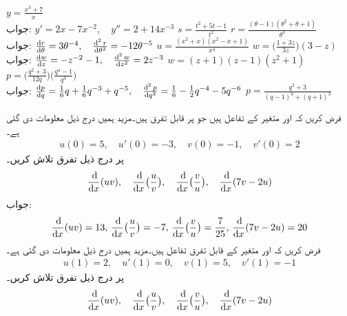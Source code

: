 $y=\tfrac{x^3+7}{x}$\\
جواب:\quad
$y'=2x-7x^{-2},\quad y''=2+14x^{-3}$
$s=\tfrac{t^2+5t-1}{t^2}$
$r=\tfrac{(\theta-1)(\theta^2+\theta+1)}{\theta^3}$\\
جواب:\quad
$\tfrac{\dif r}{\dif \theta}=3\theta^{-4},\quad \tfrac{\dif^{\,2}r}{\dif \theta^2}=-12\theta^{-5}$
$u=\tfrac{(x^2+x)(x^2-x+1)}{x^4}$
$w=\big(\tfrac{1+3z}{3z}\big)(3-z)$\\
جواب:\quad
$\tfrac{\dif w}{\dif z}=-z^{-2}-1,\quad \tfrac{\dif^{\,2}w}{\dif z^2}=2z^{-3}$
$w=(z+1)(z-1)(z^2+1)$
$p=\big(\tfrac{q^2+3}{12q}\big)\big(\tfrac{q^4-1}{q^3}\big)$\\
جواب:\quad
$\tfrac{\dif p}{\dif q}=\tfrac{1}{6}q+\tfrac{1}{6}q^{-3}+q^{-5},\quad \tfrac{\dif^{\,2}p}{\dif q^2}=\tfrac{1}{6}-\tfrac{1}{2}q^{-4}-5q^{-6}$
$p=\tfrac{q^2+3}{(q-1)^3+(q+1)^3}$

فرض کریں کہ  اور  متغیر  کے تفاعل ہیں جو  پر قابل تفرق ہیں۔مزید ہمیں درج ذیل معلومات دی گئی ہے۔
\begin{align*}
u(0)=5,\quad u'(0)=-3,\quad v(0)=-1,\quad v'(0)=2
\end{align*}  
 پر درج ذیل تفرق تلاش کریں۔
\begin{align*}
\frac{\dif}{\dif x}(uv),\quad \frac{\dif}{\dif x}\big(\frac{u}{v}\big),\quad \frac{\dif}{\dif x}\big(\frac{v}{u}\big),\quad \frac{\dif}{\dif x}(7v-2u)
\end{align*}
جواب:\quad
\begin{align*}
\frac{\dif}{\dif x}(uv)=13,\,\frac{\dif}{\dif x}\big(\frac{u}{v}\big)=-7,\, \frac{\dif}{\dif x}\big(\frac{v}{u}\big)=\frac{7}{25},\, \frac{\dif}{\dif x}(7v-2u)=20
\end{align*}
فرض کریں کہ  اور  متغیر  کے قابل تفرق تفاعل ہیں۔مزید ہمیں درج ذیل معلومات دی گئی ہے۔
\begin{align*}
u(1)=2,\quad u'(1)=0,\quad v(1)=5,\quad v'(1)=-1
\end{align*}  
 پر درج ذیل تفرق تلاش کریں۔
\begin{align*}
\frac{\dif}{\dif x}(uv),\quad \frac{\dif}{\dif x}\big(\frac{u}{v}\big),\quad \frac{\dif}{\dif x}\big(\frac{v}{u}\big),\quad \frac{\dif}{\dif x}(7v-2u)
\end{align*}

